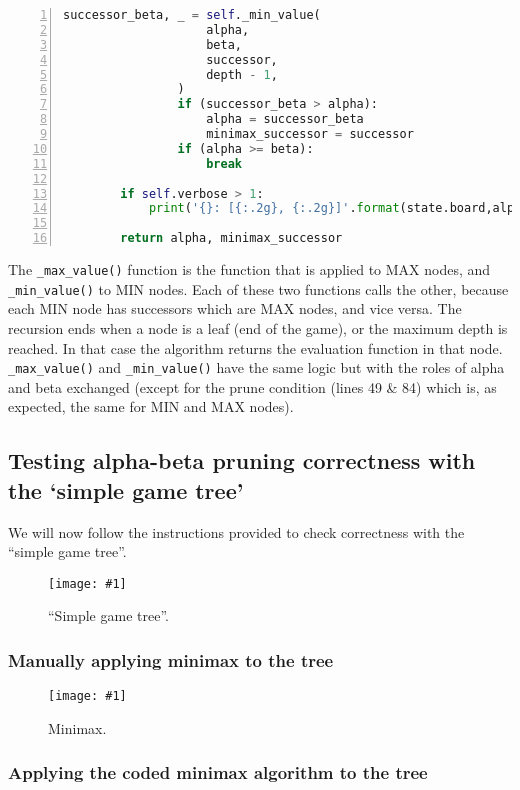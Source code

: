 \documentclass{article}
\newcommand{\myFigure}[4]{%
    \begin{figure}[H]
        \texttt{[image: \#1]}
        \centering
        \caption{#2}
        \label{#3}
    \end{figure}
}
\begin{document}
\begin{lstlisting}[language=python, caption = Implementation of the alpha beta pruning algorithm,captionpos=t,numbers=left]
                successor_beta, _ = self._min_value(
                    alpha,
                    beta,
                    successor,
                    depth - 1,
                )
                if (successor_beta > alpha):
                    alpha = successor_beta
                    minimax_successor = successor
                if (alpha >= beta):
                    break

        if self.verbose > 1:
            print('{}: [{:.2g}, {:.2g}]'.format(state.board,alpha,beta))

        return alpha, minimax_successor
\end{lstlisting}

The \texttt{\_max\_value()} function is the function that is applied to MAX nodes, and \texttt{\_min\_value()} to MIN nodes. Each of these two functions calls the other, because each MIN node has successors which are MAX nodes, and vice versa. The recursion ends when a node is a leaf (end of the game), or the maximum depth is reached. In that case the algorithm returns the evaluation function in that node. \texttt{\_max\_value()} and \texttt{\_min\_value()} have the same logic but with the roles of alpha and beta exchanged (except for the prune condition (lines 49 \& 84) which is, as expected, the same for MIN and MAX nodes).

\subsection{Testing alpha-beta pruning correctness with the `simple game tree'}\label{correctness}

We will now follow the instructions provided to check correctness with the ``simple game tree''.

\myFigure{./aditional/simple_game_tree}{``Simple game tree''.}{simple_game_tree}{.5}

\subsubsection{Manually applying minimax to the tree }

\myFigure{./aditional/manual_minimax}{Minimax.}{manual_minimax}{1}

\subsubsection{Applying the coded minimax algorithm to the tree}
\end{document}
